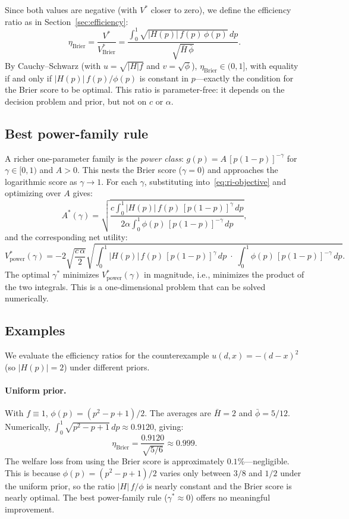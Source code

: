 \documentclass[11pt]{article}
\begin{document}
Since both values are negative (with $V^*$ closer to zero), we define the efficiency ratio as in Section~\ref{sec:efficiency}:
\begin{equation}\label{eq:brier-efficiency}
\eta_{\mathrm{Brier}} = \frac{V^*}{V^*_{\mathrm{Brier}}} = \frac{\int_0^1 \sqrt{|H(p)|\,f(p)\,\phi(p)}\,dp}{\sqrt{\bar{H}\,\bar{\phi}}}.
\end{equation}
By Cauchy--Schwarz (with $u = \sqrt{|H|f}$ and $v = \sqrt{\phi}$), $\eta_{\mathrm{Brier}} \in (0,1]$, with equality if and only if $|H(p)|\,f(p)/\phi(p)$ is constant in $p$---exactly the condition for the Brier score to be optimal. This ratio is parameter-free: it depends on the decision problem and prior, but not on $c$ or $\alpha$.

\subsection{Best power-family rule}\label{sec:power-approx}

A richer one-parameter family is the \emph{power class}: $g(p) = A\,[p(1-p)]^{-\gamma}$ for $\gamma \in [0,1)$ and $A > 0$. This nests the Brier score ($\gamma = 0$) and approaches the logarithmic score as $\gamma \to 1$. For each $\gamma$, substituting into~\eqref{eq:ri-objective} and optimizing over $A$ gives:
\[
A^*(\gamma) = \sqrt{\frac{c\int_0^1 |H(p)|\,f(p)\,[p(1-p)]^{\gamma}\,dp}{2\alpha\int_0^1 \phi(p)\,[p(1-p)]^{-\gamma}\,dp}},
\]
and the corresponding net utility:
\begin{equation}\label{eq:power-value}
V^*_{\mathrm{power}}(\gamma) = -2\sqrt{\frac{c\,\alpha}{2}} \sqrt{\int_0^1 |H(p)|\,f(p)\,[p(1-p)]^{\gamma}\,dp \;\cdot\; \int_0^1 \phi(p)\,[p(1-p)]^{-\gamma}\,dp}.
\end{equation}
The optimal $\gamma^*$ minimizes $V^*_{\mathrm{power}}(\gamma)$ in magnitude, i.e., minimizes the product of the two integrals. This is a one-dimensional problem that can be solved numerically.

\subsection{Examples}\label{sec:approx-examples}

We evaluate the efficiency ratios for the counterexample $u(d,x) = -(d-x)^2$ (so $|H(p)| = 2$) under different priors.

\paragraph{Uniform prior.} With $f \equiv 1$, $\phi(p) = (p^2 - p + 1)/2$. The averages are $\bar{H} = 2$ and $\bar{\phi} = 5/12$. Numerically, $\int_0^1 \sqrt{p^2-p+1}\,dp \approx 0.9120$, giving:
\[
\eta_{\mathrm{Brier}} = \frac{0.9120}{\sqrt{5/6}} \approx 0.999.
\]
The welfare loss from using the Brier score is approximately $0.1\%$---negligible. This is because $\phi(p) = (p^2-p+1)/2$ varies only between $3/8$ and $1/2$ under the uniform prior, so the ratio $|H|\,f/\phi$ is nearly constant and the Brier score is nearly optimal. The best power-family rule ($\gamma^* \approx 0$) offers no meaningful improvement.
\end{document}
